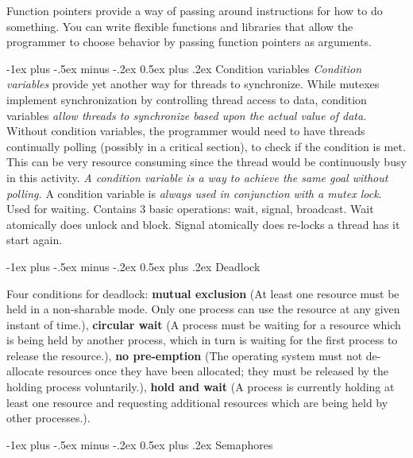 \documentclass[10pt,landscape, a4paper]{article}
\makeatletter
\renewcommand{\section}{\@startsection{section}{1}{0mm}%
                                {-1ex plus -.5ex minus -.2ex}%
                                {0.5ex plus .2ex}%
                                {\normalfont\large\bfseries}}
\makeatother
\begin{document}
\begin{multicols}{3}


Function pointers provide a way of passing around instructions for 
how to do something. You can write flexible functions and libraries 
that allow the programmer to choose behavior by passing function pointers 
as arguments.

\section{Condition variables}
\emph{Condition variables} provide yet another way for threads to synchronize. 
While mutexes implement synchronization by controlling thread access to data, 
condition variables \emph{allow threads to synchronize based upon the actual value of data}.
Without condition variables, the programmer would need to have threads 
continually polling (possibly in a critical section), to check if the 
condition is met. This can be very resource consuming since the thread 
would be continuously busy in this activity. \emph{A condition variable is a 
way to achieve the same goal without polling.}
A condition variable is \emph{always used in conjunction with a mutex lock}.
Used for waiting. Contains 3 basic operations: wait, signal, broadcast. 
Wait atomically does unlock and block. Signal atomically does re-locks a 
thread has it start again.



\section{Deadlock}

Four conditions for deadlock: \textbf{mutual exclusion} (At least one 
resource must be held in a non-sharable mode. Only one process can use 
the resource at any given instant of time.), \textbf{circular wait} 
(A process must be waiting for a resource which is being held by another 
process, which in turn is waiting for the first process to release the 
resource.), \textbf{no pre-emption} (The operating system must not 
de-allocate resources once they have been allocated; they must be 
released by the holding process voluntarily.), \textbf{hold and wait} 
(A process is currently holding at least one resource and requesting 
additional resources which are being held by other processes.). 



\section{Semaphores}


\end{multicols}
\end{document}
